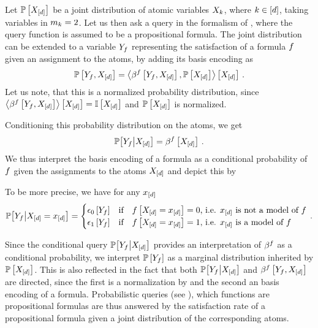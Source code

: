 
Let $\mathbb{P}\left[X_{[d]}\right]$ be a joint distribution of atomic variables $X_{k}$, where $k\in[d]$, taking variables in $m_{k}=2$.
Let us then ask a query in the formalism of , where the query function is assumed to be a propositional formula.
The joint distribution can be extended to a variable $Y_{f}$ representing the satisfaction of a formula $f$ given an assignment to the atoms, by adding its basis encoding as
\begin{align*}
    \mathbb{P}\left[Y_{f},X_{[d]}\right]
    = \left\langle \beta^{f}\left[Y_{f},X_{[d]}\right],\mathbb{P}\left[X_{[d]}\right]\right\rangle \left[ X_{[d]} \right] \, .
\end{align*}
Let us note, that this is a normalized probability distribution, since $\left\langle \beta^{f}\left[Y_{f},X_{[d]}\right]\right\rangle \left[ X_{[d]} \right]=\mathbb{I}\left[X_{[d]}\right]$ and $\mathbb{P}\left[X_{[d]}\right]$ is normalized.

Conditioning this probability distribution on the atoms, we get
\begin{align*}
    \mathbb{P}\big[Y_{f}\big|X_{[d]}\big]
    = \beta^{f}\left[X_{[d]}\right] \, .
\end{align*}
We thus interpret the basis encoding of a formula as a conditional probability of $f$ given the assignments to the atoms $X_{[d]}$ and depict this by
\begin{center}
    
\end{center}
To be more precise, we have for any $x_{[d]}$
\begin{align*}
    \mathbb{P}\big[Y_{f}\big|X_{[d]}=x_{[d]}\big] =
    \begin{cases}
        \epsilon_{0}\left[Y_{f}\right] & \text{if}\quad f\left[X_{[d]}=x_{[d]}\right] = 0 \text{, i.e. $x_{[d]}$ is not a model of $f$} \\
        \epsilon_{1}\left[Y_{f}\right] & \text{if}\quad f\left[X_{[d]}=x_{[d]}\right] = 1 \text{, i.e. $x_{[d]}$ is a model of $f$}
    \end{cases} \, .
\end{align*}

Since the conditional query $\mathbb{P}\big[Y_{f}\big|X_{[d]}\big]$ provides an interpretation of $\beta^{f}$ as a conditional probability, we interpret $\mathbb{P}\left[Y_{f}\right]$ as a marginal distribution inherited by $\mathbb{P}\left[X_{[d]}\right]$.
This is also reflected in the fact that both $\mathbb{P}\big[Y_{f}\big|X_{[d]}\big]$ and $\beta^{f}\left[Y_{f},X_{[d]}\right]$ are directed, since the first is a normalization by  and the second an basis encoding of a formula.
Probabilistic queries (see ), which functions are propositional formulas are thus answered by the satisfaction rate of a propositional formula given a joint distribution of the corresponding atoms.


